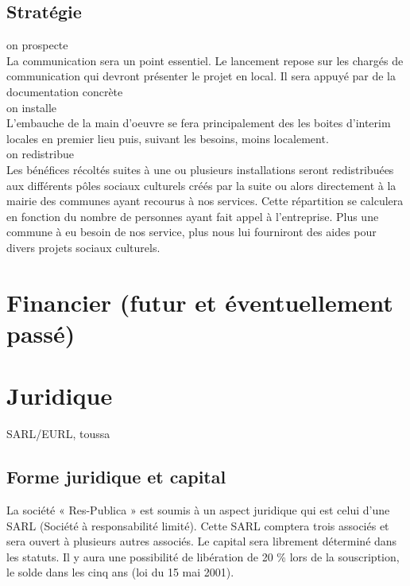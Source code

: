 \documentclass[10pt]{article}
\begin{document}
\subsection{Stratégie}
\label{sub:strategie}
on prospecte\\
La communication sera un point essentiel. Le lancement repose sur les chargés de communication qui devront présenter le projet en local. Il sera appuyé par de la documentation concrète \\
on installe\\
L'embauche de la main d'oeuvre se fera principalement des les boites d'interim locales en premier lieu puis, suivant les besoins, moins localement. \\
on redistribue\\
Les bénéfices récoltés suites à une ou plusieurs installations seront redistribuées aux différents pôles sociaux culturels créés par la suite ou alors directement à la mairie des communes ayant recourus à nos services. Cette répartition se calculera en fonction du nombre de personnes ayant fait appel à l'entreprise. Plus une commune à eu besoin de nos service, plus nous lui fourniront des aides pour divers projets sociaux culturels.


\section{Financier (futur et éventuellement passé)}
\label{sec:financier}


\section{Juridique}
\label{sec:juridique}
SARL/EURL, toussa \\

\subsection{Forme juridique et capital}
\label{sub:juridique_capital}

La société « Res-Publica » est soumis à un aspect juridique qui est celui d'une SARL (Société à responsabilité limité). Cette SARL comptera trois associés et sera ouvert à plusieurs autres associés. Le capital sera librement déterminé dans les statuts. Il y aura une possibilité de libération de 20 \% lors de la souscription, le solde dans les cinq ans (loi du 15 mai 2001).
\end{document}
